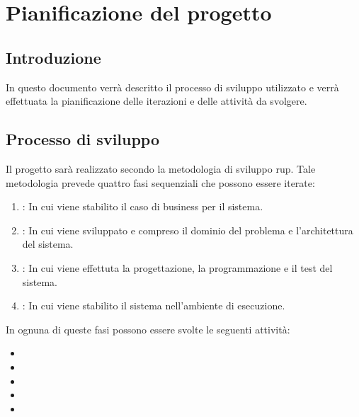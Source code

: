 \chapter{Pianificazione del progetto} 
\label{cha:pianificazione_del_progetto}	

\section{Introduzione}
In questo documento verrà descritto il processo di sviluppo utilizzato e verrà effettuata la pianificazione delle iterazioni e delle attività da svolgere.

\section{Processo di sviluppo}
\label{sec:processo_di_sviluppo}
Il progetto sarà realizzato secondo la metodologia di sviluppo \gls{rup}.
Tale metodologia prevede quattro fasi sequenziali che possono essere iterate:
\begin{enumerate}
	\item {}: In cui viene stabilito il caso di business per il sistema.
	\item {}: In cui viene sviluppato e compreso il dominio del problema e l'architettura del sistema.
	\item {}: In cui viene effettuta la progettazione, la programmazione e il test del sistema.
	\item {}: In cui viene stabilito il sistema nell'ambiente di esecuzione.
\end{enumerate}

\noindent
In ognuna di queste fasi possono essere svolte le seguenti attività:
\begin{itemize}
	\item {}
	\item {}
	\item {}
	\item {}
	\item {}
\end{itemize}

